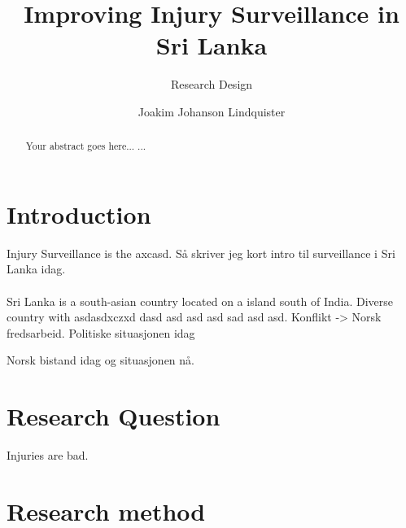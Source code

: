\documentclass[UKenglish]{article}
\title{Improving Injury Surveillance in Sri Lanka}
\subtitle{Research Design}
\author{Joakim Johanson Lindquister}
\begin{document}
\ififorside{}
\begin{abstract}
Your abstract goes here...
...
\end{abstract}
\section*{Introduction} 
Injury Surveillance is the axcasd. Så skriver jeg kort intro til surveillance i Sri Lanka idag. 
\\ \\
Sri Lanka is a south-asian country located on a island south of India. Diverse country with asdasdxczxd dasd asd asd asd sad asd asd. Konflikt -> Norsk fredsarbeid. Politiske situasjonen idag

Norsk bistand idag og situasjonen nå. 


\section*{Research Question}
Injuries are bad.

\section*{Research method}
\end{document}
